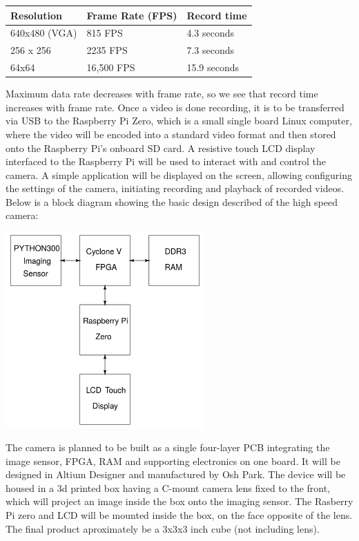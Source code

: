 \documentclass[12pt]{article}
\begin{document}
\begin{table}[h]
 \renewcommand\tabcolsep{12pt}
\renewcommand{\arraystretch}{1.25}
\centering
\begin{tabular}{lll}
\hline\hline
\textbf{Resolution} & \textbf{Frame Rate (FPS)} & \textbf{Record time}\\ 
\hline 
640x480 (VGA) & 815 FPS & 4.3 seconds\\ 
\hline 
256 x 256 & 2235 FPS & 7.3 seconds\\ 
\hline 
64x64 & 16,500 FPS & 15.9 seconds\\ 
\hline 
\end{tabular}
\label{table:name}
\end{table}
Maximum data rate decreases with frame rate, so we see that record time increases with frame rate. Once a video is done recording, it is to be transferred via USB to the Raspberry Pi Zero, which is a small single board Linux computer, where the video will be encoded into a standard video format and then stored onto the Raspberry Pi's onboard SD card. A resistive touch LCD display interfaced to the Raspberry Pi will be used to interact with and control the camera. A simple application will be displayed on the screen, allowing configuring the settings of the camera, initiating recording and playback of recorded videos. Below is a block diagram showing the basic design described of the high speed camera:
\begin{center}
\includegraphics[width=3in]{hsc.png}
\end{center}
The camera is planned to be built as a single four-layer PCB integrating the image sensor, FPGA, RAM and supporting electronics on one board. It will be designed in Altium Designer and manufactured by Osh Park. The device will be housed in a 3d printed box having a C-mount camera lens fixed to the front, which will project an image inside the box onto the imaging sensor. The Rasberry Pi zero and LCD will be mounted inside the box, on the face opposite of the lens. The final product aproximately be a 3x3x3 inch cube (not including lens). 
\end{document}
